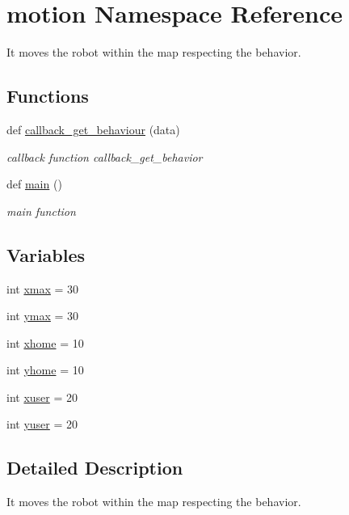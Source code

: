 \hypertarget{namespacemotion}{}\section{motion Namespace Reference}
\label{namespacemotion}


It moves the robot within the map respecting the behavior.  


\subsection*{Functions}
\begin{DoxyCompactItemize}
\item 
def \hyperlink{namespacemotion_a223e65905edcd5f4605198efb23d2ca3}{callback\+\_\+get\+\_\+behaviour} (data)
\begin{DoxyCompactList}\small\item\em callback function callback\+\_\+get\+\_\+behavior \end{DoxyCompactList}\item 
def \hyperlink{namespacemotion_ad6289fca8572f5af95fd28f4c2dbc68d}{main} ()
\begin{DoxyCompactList}\small\item\em main function \end{DoxyCompactList}\end{DoxyCompactItemize}
\subsection*{Variables}
\begin{DoxyCompactItemize}
\item 
int \hyperlink{namespacemotion_ad15e7b7b1c76162401252ee7533515a4}{xmax} = 30
\item 
int \hyperlink{namespacemotion_a93496959e7cd7b64c958600e13052b02}{ymax} = 30
\item 
int \hyperlink{namespacemotion_a8e0cdf80e6970df1d82ccd96e3f68a1a}{xhome} = 10
\item 
int \hyperlink{namespacemotion_ad24c81915bdf6ae465698c9f63e0c419}{yhome} = 10
\item 
int \hyperlink{namespacemotion_ac1191b288873954280855513ee9ed701}{xuser} = 20
\item 
int \hyperlink{namespacemotion_ae750031c9c1b1e4435481bee11eaf94e}{yuser} = 20
\end{DoxyCompactItemize}


\subsection{Detailed Description}
It moves the robot within the map respecting the behavior. 

